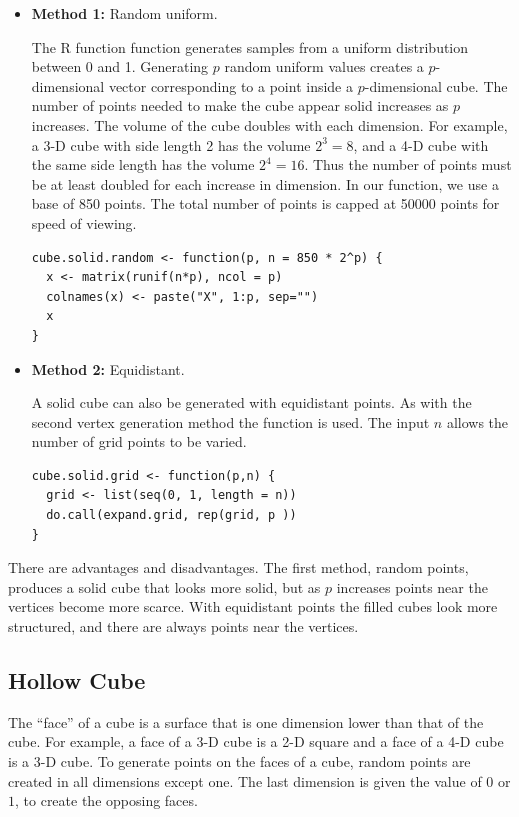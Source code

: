 \documentclass[article]{jss}
\begin{document}
\begin{itemize}

  \item {\bf Method 1:} Random uniform.
  
    The R function  function generates samples from a
    uniform distribution between 0 and 1. Generating $p$ random
    uniform values creates a $p$-dimensional vector corresponding to a
    point inside a $p$-dimensional cube. The number of points needed
    to make the cube appear solid increases as $p$ increases. The
    volume of the cube doubles with each dimension. For example, a 3-D
    cube with side length 2 has the volume $2^3=8$, and a 4-D cube
    with the same side length has the volume $2^4=16$. Thus the number
    of points must be at least doubled for each increase in
    dimension. In our function, we use a base of 850 points. The total
    number of points is capped at 50000 points for speed of viewing.

\begin{verbatim}
cube.solid.random <- function(p, n = 850 * 2^p) {
  x <- matrix(runif(n*p), ncol = p)
  colnames(x) <- paste("X", 1:p, sep="")
  x
}
\end{verbatim}

  \item {\bf Method 2:} Equidistant.
  
    A solid cube can also be generated with equidistant points. As
    with the second vertex generation method the 
    function is used. The input $n$ allows the number of grid points
    to be varied.

\begin{verbatim}
cube.solid.grid <- function(p,n) {
  grid <- list(seq(0, 1, length = n))
  do.call(expand.grid, rep(grid, p ))
}
\end{verbatim}
\end{itemize}

There are advantages and disadvantages.  The first method, random
points, produces a solid cube that looks more solid, but as $p$
increases points near the vertices become more scarce.  With
equidistant points the filled cubes look more structured, and there
are always points near the vertices.

\subsection{Hollow Cube}

The ``face'' of a cube is a surface that is one dimension lower than
that of the cube.  For example, a face of a 3-D cube is a 2-D square
and a face of a 4-D cube is a 3-D cube. To generate points on the
faces of a cube, random points are created in all dimensions except
one. The last dimension is given the value of $0$ or $1$, to create
the opposing faces.
\end{document}
